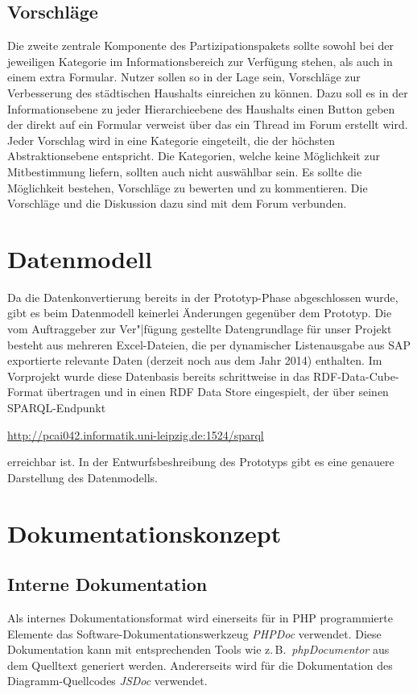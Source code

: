 \documentclass[a4paper,11pt,twoside]{article}
\begin{document}
\subsection{Vorschläge}
Die zweite zentrale Komponente des Partizipationspakets sollte sowohl bei der
jeweiligen Kategorie im Informationsbereich zur Verfügung stehen, als auch in
einem extra Formular. Nutzer sollen so in der Lage sein, Vorschläge zur
Verbesserung des städtischen Haushalts einreichen zu können. Dazu soll es in
der Informationsebene zu jeder Hierarchieebene des Haushalts einen Button geben
der direkt auf ein Formular verweist über das ein Thread im Forum erstellt
wird. Jeder Vorschlag wird in eine Kategorie eingeteilt, die der höchsten
Abstraktionsebene entspricht. Die Kategorien, welche keine Möglichkeit zur
Mitbestimmung liefern, sollten auch nicht auswählbar sein. Es sollte die
Möglichkeit bestehen, Vorschläge zu bewerten und zu kommentieren. Die
Vorschläge und die Diskussion dazu sind mit dem Forum verbunden.

\section{Datenmodell}
Da die Datenkonvertierung bereits in der Prototyp-Phase abgeschlossen wurde,
gibt es beim Datenmodell keinerlei Änderungen gegenüber dem Prototyp. Die vom
Auftraggeber zur Ver"|fügung gestellte Datengrundlage für unser Projekt besteht
aus mehreren Excel-Dateien, die per dynamischer Listenausgabe aus SAP
exportierte relevante Daten (derzeit noch aus dem Jahr 2014) enthalten. Im
Vorprojekt wurde diese Datenbasis bereits schrittweise in das
RDF-Data-Cube-Format übertragen und in einen RDF Data Store eingespielt, der
über seinen SPARQL-Endpunkt
\begin{center}
  \url{http://pcai042.informatik.uni-leipzig.de:1524/sparql}
\end{center}
erreichbar ist. In der Entwurfsbeshreibung des Prototyps gibt es eine genauere
Darstellung des Datenmodells.

\section{Dokumentationskonzept}

\subsection{Interne Dokumentation}
Als internes Dokumentationsformat wird einerseits für in PHP programmierte
Elemente das Software-Dokumentationswerkzeug \emph{PHPDoc} verwendet. Diese
Dokumentation kann mit entsprechenden Tools wie z.\,B.\ \emph{phpDocumentor}
aus dem Quelltext generiert werden. Andererseits wird für die Dokumentation
des Diagramm-Quellcodes \emph{JSDoc} verwendet.
\end{document}
